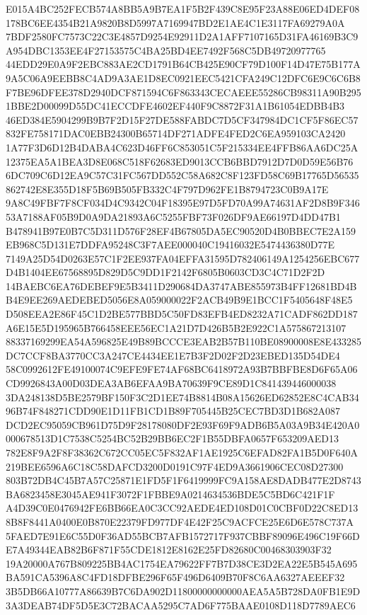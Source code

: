 \documentclass[UTF8,fontset=fandol,zihao=-4,a4paper]{ctexart}
\begin{document}
{{E015A4BC252FECB574A8BB5A9B7EA1F5B2F439C8E95F23A88E06ED4DEF08178BC6EE4354B21A9820B8D5997A7169947BD2E1AE4C1E3117FA69279A0A
7BDF2580FC7573C22C3E4857D9254E92911D2A1AFF7107165D31FA46169B3C9A954DBC1353EE4F27153575C4BA25BD4EE7492F568C5DB49720977765
44EDD29E0A9F2EBC883AE2CD1791B64CB425E90CF79D100F14D47E75B177A9A5C06A9EEBB8C4AD9A3AE1D8EC0921EEC5421CFA249C12DFC6E9C6C6B8
F7BE96DFEE378D2940DCF871594C6F863343CECAEEE55286CB98311A90B2951BBE2D00099D55DC41ECCDFE4602EF440F9C8872F31A1B61054EDBB4B3
46ED384E5904299B9B7F2D15F27DE588FABDC7D5CF347984DC1CF5F86EC57832FE758171DAC0EBB24300B65714DF271ADFE4FED2C6EA959103CA2420
1A77F3D6D12B4DABA4C623D46FF6C853051C5F215334EE4FFB86AA6DC25A12375EA5A1BEA3D8E068C518F62683ED9013CCB6BBD7912D7D0D59E56B76
6DC709C6D12EA9C57C31FC567DD552C58A682C8F123FD58C69B17765D56535862742E8E355D18F5B69B505FB332C4F797D962FE1B8794723C0B9A17E
9A8C49FBF7F8CF034D4C9342C04F18395E97D5FD70A99A74631AF2D8B9F34653A7188AF05B9D0A9DA21893A6C5255FBF73F026DF9AE66197D4DD47B1
B478941B97E0B7C5D311D576F28EF4B67805DA5EC90520D4B0BBEC7E2A159EB968C5D131E7DDFA95248C3F7AEE000040C19416032E5474436380D77E
7149A25D54D0263E57C1F2EE937FA04EFFA31595D782406149A1254256EBC677D4B1404EE67568895D829D5C9DD1F2142F6805B0603CD3C4C71D2F2D
14BAEBC6EA76DEBEF9E5B3411D290684DA3747ABE855973B4FF12681BD4BB4E9EE269AEDEBED5056E8A059000022F2ACB49B9E1BCC1F5405648F48E5
D508EEA2E86F45C1D2BE577BBD5C50FD83EFB4ED8232A71CADF862DD187A6E15E5D195965B766458EEE56EC1A21D7D426B5B2E922C1A575867213107
88337169299EA54A596825E49B89BCCCE3EAB2B57B110BE08900008E8E433285DC7CCF8BA3770CC3A247CE4434EE1E7B3F2D02F2D23EBED135D54DE4
58C0992612FE49100074C9EFE9FE74AF68BC6418972A93B7BBFBE8D6F65A06CD9926843A00D03DEA3AB6EFAA9BA70639F9CE89D1C841439446000038
3DA248138D5BE2579BF150F3C2D1EE74B8814B08A15626ED62852E8C4CAB3496B74F848271CDD90E1D11FB1CD1B89F705445B25CEC7BD3D1B682A087
DCD2EC95059CB961D75D9F28178080DF2E93F69F9ADB6B5A03A9B34E420A0000678513D1C7538C5254BC52B29BB6EC2F1B55DBFA0657F653209AED13
782E8F9A2F8F38362C672CC05EC5F832AF1AE1925C6EFAD82FA1B5D0F640A219BEE6596A6C18C58DAFCD3200D0191C97F4ED9A3661906CEC08D27300
803B72DB4C45B7A57C25871E1FD5F1F6419999FC9A158AE8DADB477E2D8743BA6823458E3045AE941F3072F1FBBE9A0214634536BDE5C5BD6C421F1F
A4D39C0E0476942FE6BB66EA0C3CC92AEDE4ED108D01C0CBF0D22C8ED138B8F8441A0400E0B870E22379FD977DF4E42F25C9ACFCE25E6D6E578C737A
5FAED7E91E6C55D0F36AD55BCB7AFB1572717F937CBBF89096E496C19F66DE7A49344EAB82B6F871F55CDE1812E8162E25FD82680C00468303903F32
19A20000A767B809225BB4AC1754EA79622FF7B7D38CE3D2EA22E5B545A695BA591CA5396A8C4FD18DFBE296F65F496D6409B70F8C6AA6327AEEEF32
3B5DB66A10777A86639B7C6DA902D11800000000000AEA5A5B728DA0FB1E9D3A3DEAB74DF5D5E3C72BACAA5295C7AD6F775BAAE0108D118D7789AEC6
}}
\end{document}
